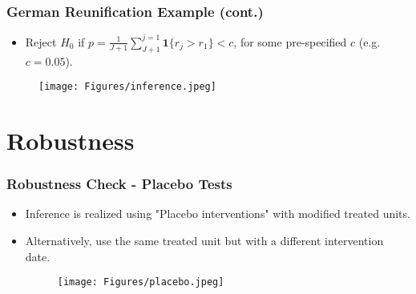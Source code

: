 \documentclass[xcolor=svgnames,t]{beamer}
\begin{document}
\begin{frame}
    \frametitle{German Reunification Example (cont.)}
    \begin{itemize}
        \item Reject $H_0$ if $p=\frac{1}{J+1}\sum_{J+1}^{j=1}\mathbf{1}\{r_j > r_1\}<c$, for some pre-specified $c$ (e.g. $c=0.05$).
    \end{itemize}
    \begin{figure}[htbp]
        \centering
        \texttt{[image: Figures/inference.jpeg]}
        \label{fig:figure4}
    \end{figure}
\end{frame}

\section{Robustness}
\begin{frame}
    \frametitle{Robustness Check - Placebo Tests}
    \begin{itemize}
        \item<1-> Inference is realized using "Placebo interventions" with modified treated units.
        \item<2-> Alternatively, use the same treated unit but with a different intervention date.
    \begin{figure}[htbp]
        \centering
        \texttt{[image: Figures/placebo.jpeg]}
        \label{fig:figure5}
    \end{figure}
\end{itemize}

\end{frame}
\end{document}
